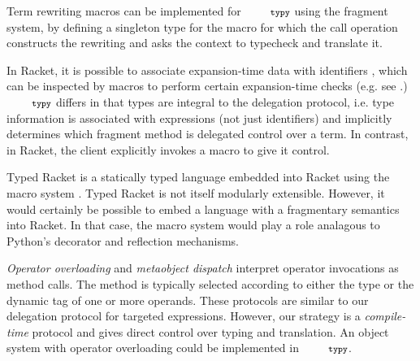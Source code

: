 \documentclass[10pt]{sigplanconf}
\newcommand{\typy}{\texttt{\footnotesize typy}}
\begin{document}
Term rewriting macros can be implemented for $\typy$ using the fragment system, by defining a singleton type for the macro for which the call operation constructs the rewriting and asks the context to typecheck and translate it.

In Racket, it is possible to associate expansion-time data with identifiers \cite{DBLP:journals/jfp/FlattCDF12}, which can be inspected by macros to perform certain expansion-time checks (e.g. see \cite{Flatt:2012:CLR:2063176.2063195}.) $\typy$ differs in that types are integral to the delegation protocol, i.e. type information is associated with expressions (not just identifiers) and implicitly determines which fragment method is delegated control over a term. In contrast, in Racket, the client explicitly invokes a macro to give it control. %

Typed Racket is a statically typed language embedded into Racket using the macro system \cite{TypedScheme2008,culpepper2007advanced}. Typed Racket is not itself modularly extensible. However, it would certainly be possible to embed a language with a fragmentary semantics into Racket. In that case, the macro system would play a role analagous to Python's decorator and reflection mechanisms.


{\it Operator overloading} \cite{vanWijngaarden:Mailloux:Peck:Koster:Sintzoff:Lindsey:Meertens:Fisker:acta:1975} and {\it metaobject dispatch} \cite{Kiczales91} interpret operator invocations as method calls. The method is typically selected according to either the type or the dynamic tag of one or more operands. These protocols are similar to our delegation protocol for targeted expressions. However, our strategy is a {\it compile-time} protocol and gives direct control over typing and translation. An object system with  operator overloading could be implemented in $\typy$. %

\end{document}
